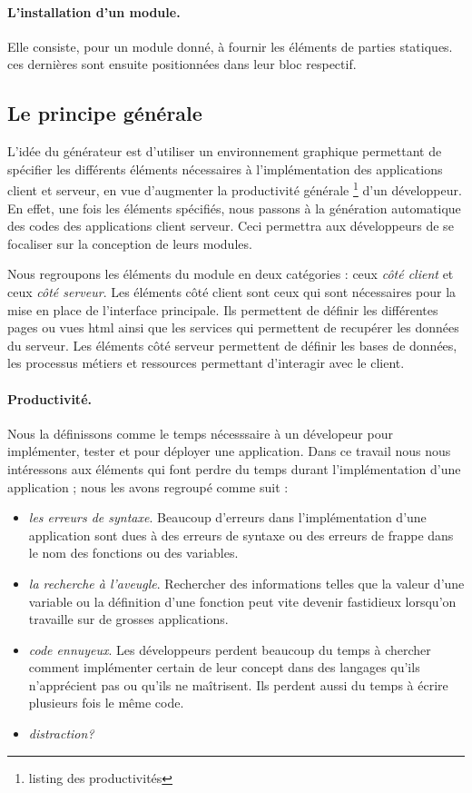 \documentclass[a4paper,11pt]{report}
\begin{document}
\paragraph{L'installation d'un module.}
Elle consiste, pour un module donné, à  fournir les éléments de
parties statiques. ces dernières sont ensuite positionnées dans leur
bloc respectif.

\subsection{Le principe générale \label{par:product}}

L'idée du générateur est d'utiliser un environnement graphique
permettant de spécifier les différents éléments nécessaires à
l'implémentation des applications client et serveur, en vue d'augmenter
la productivité générale \footnote{listing des productivités} d'un développeur. En effet, une fois les
éléments spécifiés, nous passons à la génération automatique des codes
des applications client serveur. Ceci permettra aux développeurs de se
focaliser sur la conception de leurs modules.

Nous regroupons les éléments du module en deux catégories : ceux {\em
  côté client } et ceux {\em côté serveur}.
Les éléments côté client sont ceux qui sont nécessaires pour la mise
en place de l'interface principale. Ils permettent de définir les
différentes pages ou vues html ainsi que les services qui permettent
de recupérer les données du serveur.
Les éléments côté serveur permettent de définir les bases de données,
les processus métiers et ressources permettant d'interagir avec le
client.

\paragraph{Productivité. } Nous la définissons comme le temps nécesssaire à un
dévelopeur pour implémenter, tester et pour déployer une
application. Dans ce travail nous nous intéressons aux éléments qui
font perdre du temps durant l'implémentation d'une application ; nous
les avons regroupé comme suit :
\begin{itemize}
\item {\em les erreurs de syntaxe}. Beaucoup d'erreurs dans
  l'implémentation d'une application sont dues à des erreurs de syntaxe
  ou des erreurs de frappe dans le nom des fonctions ou des variables.
\item {\em la recherche à l'aveugle}. Rechercher des informations
  telles que la valeur d'une variable ou la définition d'une fonction
  peut vite devenir fastidieux lorsqu'on travaille sur de grosses
  applications.
\item {\em code ennuyeux}. Les développeurs perdent beaucoup du temps
  à chercher comment implémenter certain de leur concept dans des
  langages qu'ils n'apprécient pas ou qu'ils ne maîtrisent. Ils
  perdent aussi du temps à écrire plusieurs fois le même code.
\item {\em distraction?}
\end{itemize}
\end{document}
